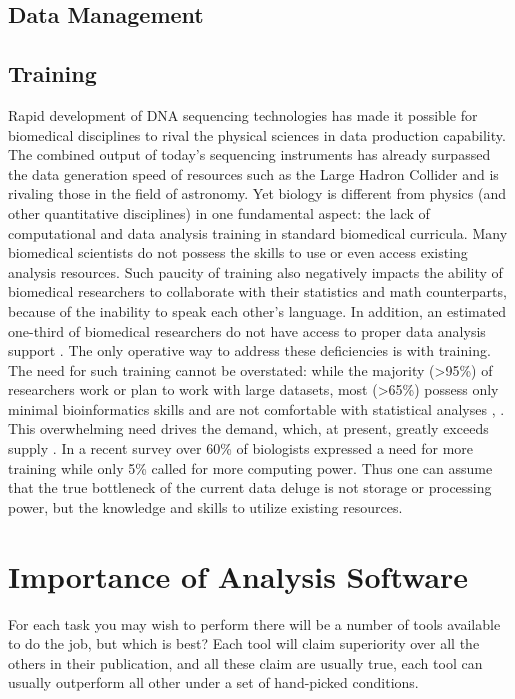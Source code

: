 \subsection{Data Management}

\subsection{Training}

Rapid development of DNA sequencing technologies has made it possible for biomedical disciplines to rival the physical sciences in data production capability. The combined output of today’s sequencing instruments has already surpassed the data generation speed of resources such as the Large Hadron Collider and is rivaling those in the field of astronomy. Yet biology is different from physics (and other quantitative disciplines) in one fundamental aspect: the lack of computational and data analysis training in standard biomedical curricula. Many biomedical scientists do not possess the skills to use or even access existing analysis resources.
Such paucity of training also negatively impacts the ability of biomedical researchers to collaborate with their statistics and math counterparts, because of the inability to speak each other’s language. In addition, an estimated one-third of biomedical researchers do not have access to proper data analysis support \cite{larcombe2017elixir}. The only operative way to address these deficiencies is with training. The need for such training cannot be overstated: while the majority (>95\%) of researchers work or plan to work with large datasets, most (>65\%) possess only minimal bioinformatics skills and are not comfortable with statistical analyses \cite{larcombe2017elixir}, \cite{williams2017vision}.
This overwhelming need drives the demand, which, at present, greatly exceeds supply \cite{attwood2017global}. In a recent survey \cite{survey2013embl} over 60\% of biologists expressed a need for more training while only 5\% called for more computing power. Thus one can assume that the true bottleneck of the current data deluge is not storage or processing power, but the knowledge and skills to utilize existing resources.


\section{Importance of Analysis Software}
For each task you may wish to perform there will be a number of tools available to do the job, but which is best? Each tool will claim superiority over all the others in their publication, and all these claim are usually true, each tool can usually outperform all other under a set of hand-picked conditions.

